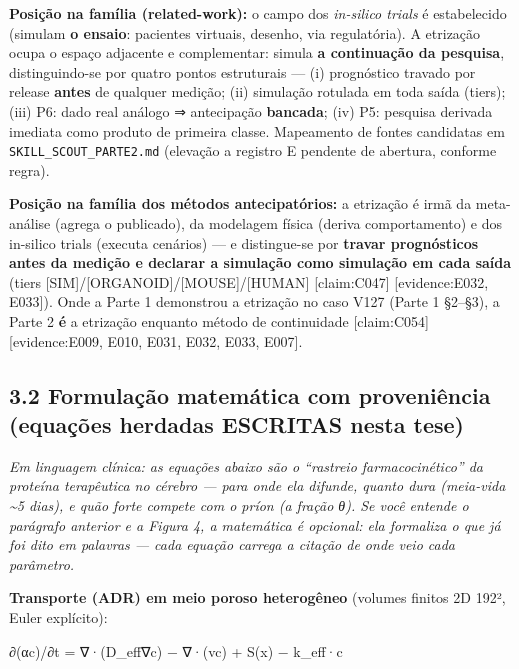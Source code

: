 \documentclass[
  12pt,
]{report}
\begin{document}
\textbf{Posição na família (related-work):} o campo dos \emph{in-silico
trials} é estabelecido (simulam \textbf{o ensaio}: pacientes virtuais,
desenho, via regulatória). A etrização ocupa o espaço adjacente e
complementar: simula \textbf{a continuação da pesquisa}, distinguindo-se
por quatro pontos estruturais --- (i) prognóstico travado por release
\textbf{antes} de qualquer medição; (ii) simulação rotulada em toda
saída (tiers); (iii) P6: dado real análogo ⇒ antecipação
\textbf{bancada}; (iv) P5: pesquisa derivada imediata como produto de
primeira classe. Mapeamento de fontes candidatas em
\texttt{SKILL\_SCOUT\_PARTE2.md} (elevação a registro E pendente de
abertura, conforme regra).

\textbf{Posição na família dos métodos antecipatórios:} a etrização é
irmã da meta-análise (agrega o publicado), da modelagem física (deriva
comportamento) e dos in-silico trials (executa cenários) --- e
distingue-se por \textbf{travar prognósticos antes da medição e declarar
a simulação como simulação em cada saída} (tiers
{[}SIM{]}/{[}ORGANOID{]}/{[}MOUSE{]}/{[}HUMAN{]} {[}claim:C047{]}
{[}evidence:E032, E033{]}). Onde a Parte 1 demonstrou a etrização no
caso V127 (Parte 1 §2--§3), a Parte 2 \textbf{é} a etrização enquanto
método de continuidade {[}claim:C054{]} {[}evidence:E009, E010, E031,
E032, E033, E007{]}.

\hypertarget{formulauxe7uxe3o-matemuxe1tica-com-proveniuxeancia-equauxe7uxf5es-herdadas-escritas-nesta-tese}{%
\subsection{3.2 Formulação matemática com proveniência (equações
herdadas ESCRITAS nesta
tese)}\label{formulauxe7uxe3o-matemuxe1tica-com-proveniuxeancia-equauxe7uxf5es-herdadas-escritas-nesta-tese}}

\emph{Em linguagem clínica: as equações abaixo são o ``rastreio
farmacocinético'' da proteína terapêutica no cérebro --- para onde ela
difunde, quanto dura (meia-vida \textasciitilde5 dias), e quão forte
compete com o príon (a fração θ). Se você entende o parágrafo anterior e
a Figura 4, a matemática é opcional: ela formaliza o que já foi dito em
palavras --- cada equação carrega a citação de onde veio cada
parâmetro.}

\textbf{Transporte (ADR) em meio poroso heterogêneo} (volumes finitos 2D
192², Euler explícito):

∂(αc)/∂t = ∇·(D\_eff∇c) − ∇·(vc) + S(x) − k\_eff·c
\end{document}
